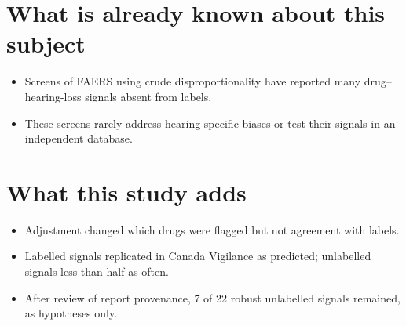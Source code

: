 \section*{What is already known about this subject}
\begin{itemize}
\item Screens of FAERS using crude disproportionality have reported many drug--hearing-loss signals absent from labels.
\item These screens rarely address hearing-specific biases or test their signals in an independent database.
\end{itemize}

\section*{What this study adds}
\begin{itemize}
\item Adjustment changed which drugs were flagged but not agreement with labels.
\item Labelled signals replicated in Canada Vigilance as predicted; unlabelled signals less than half as often.
\item After review of report provenance, 7 of 22 robust unlabelled signals remained, as hypotheses only.
\end{itemize}